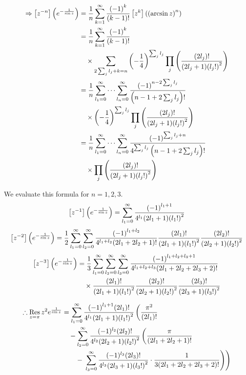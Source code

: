 \begin{align*}
    \Rightarrow \left[ z^{-n} \right] \left( e^{-\frac{1}{\sin z}} \right)
    &= \frac{1}{n} \sum_{k=1}^\infty \frac{{(-1)}^k}{(k-1)!} \left[ z^{k} \right] \left( {(\arcsin z)}^n \right) \\
    &= \frac{1}{n} \sum_{k=1}^\infty \frac{{(-1)}^k}{(k-1)!} \\
    &\quad \times \sum_{2\sum_j l_j + k = n} {\left( -\frac{1}{4} \right)}^{\sum_j l_j}
            \prod_j \left( \frac{(2l_j)!}{(2l_j + 1) {(l_j !)}^2} \right) \\
    &= \frac{1}{n} \sum_{l_1=0}^\infty \cdots \sum_{l_n=0}^\infty
       \frac{{(-1)}^{n - 2\sum_j l_j}}{\left( n - 1 + 2\sum_j l_j \right)!} \\
    &\quad \times {\left( -\frac{1}{4} \right)}^{\sum_j l_j}
            \prod_j \left( \frac{(2l_j)!}{(2l_j + 1) {(l_j !)}^2} \right) \\
    &= \frac{1}{n} \sum_{l_1=0}^\infty \cdots \sum_{l_n=0}^\infty
       \frac{{(-1)}^{\sum_j l_j + n}}{4^{\sum_j l_j} \left( n - 1 + 2\sum_j l_j \right)!} \\
    &\quad \times \prod_j \left( \frac{(2l_j)!}{(2l_j + 1) {(l_j !)}^2} \right)
\end{align*}

We evaluate this formula for $n = 1, 2, 3$.
\[
    \left[ z^{-1} \right] \left( e^{-\frac{1}{\sin z}} \right)
    = \sum_{l_1 = 0}^\infty \frac{{(-1)}^{l_1 + 1}}{4^{l_1} (2l_1 + 1) {(l_1 !)}^2}
\]
\[
    \left[ z^{-2} \right] \left( e^{-\frac{1}{\sin z}} \right)
    = \frac{1}{2} \sum_{l_1 = 0}^\infty \sum_{l_2 = 0}^\infty
      \frac{{(-1)}^{l_1 + l_2}}{4^{l_1 + l_2} (2l_1 + 2l_2 + 1)!}
      \frac{(2l_1)!}{(2l_1 + 1) {(l_1 !)}^2} \frac{(2l_2)!}{(2l_2 + 1) {(l_2 !)}^2}
\]
\begin{align*}
    \left[ z^{-3} \right] \left( e^{-\frac{1}{\sin z}} \right)
    &= \frac{1}{3} \sum_{l_1 = 0}^\infty \sum_{l_2 = 0}^\infty \sum_{l_3 = 0}^\infty
       \frac{{(-1)}^{l_1 + l_2 + l_3 + 1}}{4^{l_1 + l_2 + l_3} (2l_1 + 2l_2 + 2l_3 + 2)!} \\
    &\quad \times \frac{(2l_1)!}{(2l_1 + 1) {(l_1 !)}^2} \frac{(2l_2)!}{(2l_2 + 1) {(l_2 !)}^2}
            \frac{(2l_3)!}{(2l_3 + 1) {(l_3 !)}^2}
\end{align*}

\[
\begin{split}
    \therefore \mathop{\mathrm{Res}}_{z=\pi}{z^2 e^{\frac{1}{\sin z}}}
    &= \sum_{l_1=0}^\infty \frac{{(-1)}^{l_1 + 1} (2l_1)!}{4^{l_1} (2l_1 + 1) {(l_1 !)}^2} \left(
        \frac{\pi^2}{(2l_1)!}
    \right.\\
    &\quad - \sum_{l_2=0}^\infty \frac{{(-1)^{l_2}} (2l_2)!}{4^{l_2} (2l_2 + 1) {(l_2 !)}^2} \left(
        \frac{\pi}{(2l_1 + 2l_2 + 1)!}
    \right. \\
    &\qquad - \left.\left. \sum_{l_3=0}^\infty \frac{{(-1)^{l_3}} (2l_3)!}{4^{l_3} (2l_3 + 1) {(l_3 !)}^2}
       \cdot \frac{1}{3(2l_1 + 2l_2 + 2l_3 + 2)!} \right)\right)
\end{split}
\]

